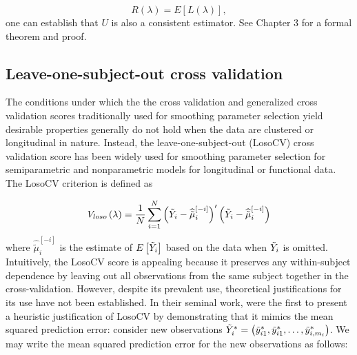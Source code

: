 \documentclass[../chapter-2-spline-representation.tex]{subfiles}
\begin{document}
 \[
 R\left(\lambda\right) = E\left[L\left(\lambda\right)\right],
 \]
\noindent
one can establish that $U$ is also a consistent estimator. See \citet{gu2013smoothing} Chapter 3 for a formal theorem and proof.


\subsection{Leave-one-subject-out cross validation}  
The conditions under which the the cross validation and generalized cross validation scores traditionally used for smoothing parameter selection yield desirable properties generally do not hold when the data are clustered or longitudinal in nature. Instead, the leave-one-subject-out (LosoCV) cross validation score has been widely used for smoothing parameter selection for semiparametric and nonparametric models for longitudinal or functional data. The LosoCV criterion is defined as

\begin{equation} \label{eq:LOSOCV}
V_{loso}\left(\lambda\right) = \frac{1}{N}\sum_{i=1}^N \left( \tilde{Y}_i - \widehat{\tilde{\mu}}^{\left[-i\right]}_{i}\right)'\left( \tilde{Y}_i -  \widehat{\tilde{\mu}}^{\left[-i\right]}_{i}\right)
\end{equation}
\noindent
where $\widehat{\tilde{\mu}}^{\left[-i\right]}_{i}$ is the estimate of $E\left[ \tilde{Y}_i \right]$ based on the data when $\tilde{Y}_i$ is omitted. Intuitively, the LosoCV score is appealing because it preserves any within-subject dependence by leaving out all observations from the same subject together in the cross-validation.  However, despite its prevalent use, theoretical justifications for its use have not been established. In their seminal work, \citet{rice1991estimating} were the first to present a heuristic justification of LosoCV by demonstrating that it mimics the mean squared prediction error: consider new observations $\tilde{Y}^*_i = \left(\tilde{y}_{i1}^*, \tilde{y}_{i1}^*, \dots, \tilde{y}_{i, m_i}^*\right)$. We may write the mean squared prediction error for the new observations as follows:  
\bigskip 
\end{document}
